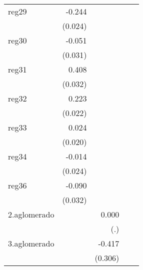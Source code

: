 {\begin{longtable}{l*{4}{D{.}{.}{-1}}}
\addlinespace
reg29       &      -0.244\sym{***}&                     &                     &                     \\
            &     (0.024)         &                     &                     &                     \\
\addlinespace
reg30       &      -0.051         &                     &                     &                     \\
            &     (0.031)         &                     &                     &                     \\
\addlinespace
reg31       &       0.408\sym{***}&                     &                     &                     \\
            &     (0.032)         &                     &                     &                     \\
\addlinespace
reg32       &       0.223\sym{***}&                     &                     &                     \\
            &     (0.022)         &                     &                     &                     \\
\addlinespace
reg33       &       0.024         &                     &                     &                     \\
            &     (0.020)         &                     &                     &                     \\
\addlinespace
reg34       &      -0.014         &                     &                     &                     \\
            &     (0.024)         &                     &                     &                     \\
\addlinespace
reg36       &      -0.090\sym{**} &                     &                     &                     \\
            &     (0.032)         &                     &                     &                     \\
\addlinespace
2.aglomerado&                     &       0.000         &                     &                     \\
            &                     &         (.)         &                     &                     \\
\addlinespace
3.aglomerado&                     &      -0.417         &                     &                     \\
            &                     &     (0.306)         &                     &                     \\

\end{longtable}}

